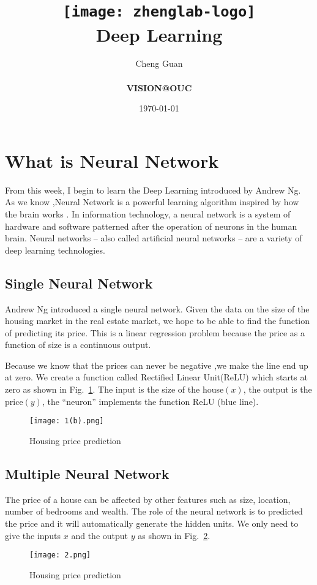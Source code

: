 \documentclass[a4paper]{article}
\title{
    \vspace*{1in}
    \texttt{[image: zhenglab-logo]} \\
    \vspace*{1.2in}
    \textbf{\huge Deep Learning}
    \vspace{0.2in}
}
\author{Cheng Guan \\
    \vspace*{0.5in} \\
    \textbf{VISION@OUC}\\
    \vspace*{1in}
}
\date{\today}
\begin{document}
\maketitle
\setcounter{page}{0}
\thispagestyle{empty}
\newpage
\section{What is Neural Network}
From this week, I begin to learn the Deep Learning introduced by Andrew Ng. As we know ,Neural Network is a powerful learning algorithm inspired by how the brain works \cite{deep}. In information technology, a neural network is a system of hardware and software patterned after the operation of neurons in the human brain. Neural networks -- also called artificial neural networks -- are a variety of deep learning technologies.
\subsection{Single Neural Network}
Andrew Ng introduced a single neural network. Given the data on the size of the housing market in the real estate market, we hope to be able to find the function of predicting its price. This is a linear regression problem because the price as a function of size is a continuous output.
\par
Because we know that the prices can never be negative ,we make the line end up at zero. We create a function called Rectified Linear Unit(ReLU) which starts at zero as shown in Fig.~\ref{fig1}. The input is the size of the house$\left(x\right)$, the output is the price$\left(y\right)$, the ``neuron'' implements the function ReLU (blue line).
\begin{figure}[h]
	\centering
	\texttt{[image: 1(b).png]}
	\caption{Housing price prediction}
	\label{fig1}
\end{figure}
\subsection{Multiple Neural Network}
The price of a house can be affected by other features such as size, location,
number of bedrooms and wealth. The role of the neural network is to
predicted the price and it will automatically generate the hidden units. We only
need to give the inputs $x$ and the output $y$ as shown in Fig.~\ref{fig2}.
\begin{figure}[h]
  \centering
  \texttt{[image: 2.png]}\\
  \caption{Housing price prediction}
  \label{fig2}
\end{figure}
\end{document}
